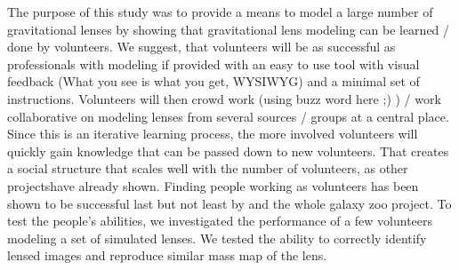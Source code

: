 The purpose of this study was to provide a means to model a large number of gravitational lenses by showing that gravitational lens modeling can be learned / done by volunteers.
We suggest, that volunteers will be as successful as professionals with modeling if provided with an easy to use tool with visual feedback (What you see is what you get, WYSIWYG) and a minimal set of instructions.
Volunteers will then crowd work (using buzz word here ;) ) / work collaborative on modeling lenses from several sources / groups at a central place.
Since this is an iterative learning process, the more involved volunteers will quickly gain knowledge that can be passed down to new volunteers.
That creates a social structure that scales well with the number of volunteers, as other projects\needcite have already shown.
Finding people working as volunteers has been shown to be successful last but not least by \sw and the whole galaxy zoo project.
To test the people's abilities, we investigated the performance of a few volunteers modeling a set of simulated lenses.
We tested the ability to correctly identify lensed images and reproduce similar mass map of the lens.


